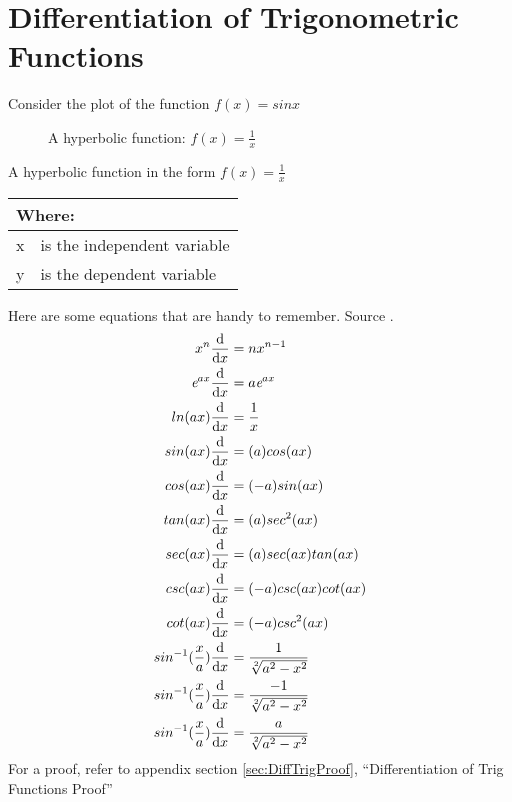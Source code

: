 \section{Differentiation of Trigonometric Functions}
\label{sec:DifferentiationOfTrigFunctions}
Consider the plot of the function $f(x) = sinx$
\begin{figure}[!htb]
\label{fig:GraphTemplate}
\caption{A hyperbolic function: $f(x) = \frac{1}{x}$}
\end{figure}
A hyperbolic function in the form $ f(x) = \frac{1}{x}$
\begin{table}[!hbt]
\label{tab:GraphTemplateParts}
\begin{tabularx}{\linewidth}{| l X |}
  \hline
  \multicolumn{2}{|l|}{Where:} \\
  \hline \hline
  x & is the independent variable\\
  y & is the dependent variable\\
\hline
\end{tabularx}
\end{table}
%
Here are some equations that are handy to remember. Source \cite{RHBDiffQuickStart}.
\begin{align}
  {x}^{n}\frac{\mathrm{d}}{\mathrm{d}x} & = n{x}^{n-1} \\
  {\emph{e}}^{ax}\frac{\mathrm{d}}{\mathrm{d}x} & = a{\emph{e}}^{ax} \\
  ln(ax)\frac{\mathrm{d}}{\mathrm{d}x} & = \frac{1}{x} \\
  sin(ax)\frac{\mathrm{d}}{\mathrm{d}x} & = (a)cos(ax) \\
  cos(ax)\frac{\mathrm{d}}{\mathrm{d}x} & = (-a)sin(ax) \\
  tan(ax)\frac{\mathrm{d}}{\mathrm{d}x} & = (a){sec}^{2}(ax) \\
  sec(ax)\frac{\mathrm{d}}{\mathrm{d}x} & = (a)sec(ax)tan(ax) \\
  csc(ax)\frac{\mathrm{d}}{\mathrm{d}x} & = (-a)csc(ax)cot(ax) \\
  cot(ax)\frac{\mathrm{d}}{\mathrm{d}x} & = (-a){csc}^{2}(ax) \\
  {sin}^{-1}(\frac{x}{a})\frac{\mathrm{d}}{\mathrm{d}x} & = \frac{1}{\sqrt[2]{{a}^{2} - {x}^{2}}} \\
  {sin}^{-1}(\frac{x}{a})\frac{\mathrm{d}}{\mathrm{d}x} & = \frac{-1}{\sqrt[2]{{a}^{2} - {x}^{2}}} \\
  {sin}^{-1}(\frac{x}{a})\frac{\mathrm{d}}{\mathrm{d}x} & = \frac{a}{\sqrt[2]{{a}^{2} - {x}^{2}}}  
\end{align}
For a proof, refer to appendix section \ref{sec:DiffTrigProof},
``Differentiation of Trig Functions Proof''
\newpage
